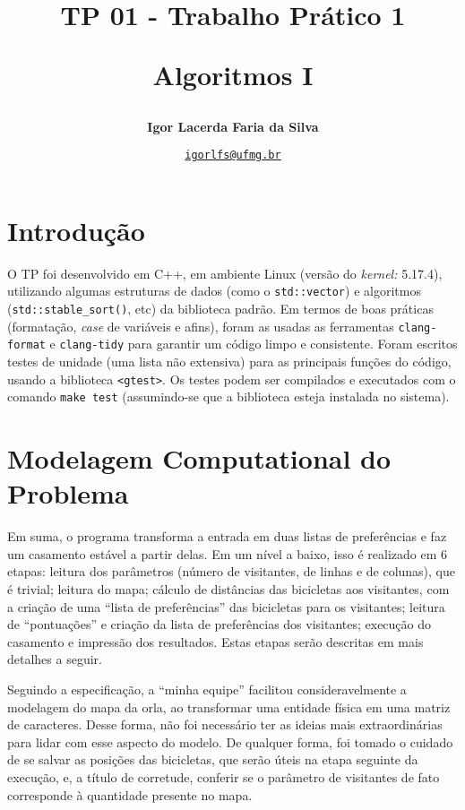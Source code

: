\documentclass{article}
\author{\textbf{Igor Lacerda Faria da Silva}}
\title{{TP 01 - Trabalho Prático 1}

Algoritmos I}
\date{%
    \href{mailto:igorlfs@ufmg.br}{\nolinkurl{igorlfs@ufmg.br}}
}
\def\code#1{\texttt{#1}}
\begin{document}
\maketitle

\section{Introdução}

O TP foi desenvolvido em C++, em ambiente Linux (versão do \textit{kernel:} 5.17.4), utilizando algumas estruturas de dados (como o \code{std::vector}) e algoritmos (\code{std::stable\_sort()}, etc) da biblioteca padrão. Em termos de boas práticas (formatação, \textit{case} de variáveis e afins), foram as usadas as ferramentas \code{clang-format} e \code{clang-tidy} para garantir um código limpo e consistente. Foram escritos testes de unidade (uma lista não extensiva) para as principais funções do código, usando a biblioteca \code{<gtest>}. Os testes podem ser compilados e executados com o comando \code{make test} (assumindo-se que a biblioteca esteja instalada no sistema).

\section{Modelagem Computational do Problema}

Em suma, o programa transforma a entrada em duas listas de preferências e faz um casamento estável a partir delas. Em um nível a baixo, isso é realizado em 6 etapas: leitura dos parâmetros (número de visitantes, de linhas e de colunas), que é trivial; leitura do mapa; cálculo de distâncias das bicicletas aos visitantes, com a criação de uma ``lista de preferências'' das bicicletas para os visitantes; leitura de ``pontuações'' e criação da lista de preferências dos visitantes; execução do casamento e impressão dos resultados. Estas etapas serão descritas em mais detalhes a seguir.

Seguindo a especificação, a ``minha equipe'' facilitou consideravelmente a modelagem do mapa da orla, ao transformar uma entidade física em uma matriz de caracteres. Desse forma, não foi necessário ter as ideias mais extraordinárias para lidar com esse aspecto do modelo. De qualquer forma, foi tomado o cuidado de se salvar as posições das bicicletas, que serão úteis na etapa seguinte da execução, e, a título de corretude, conferir se o parâmetro de visitantes de fato corresponde à quantidade presente no mapa.
\end{document}
